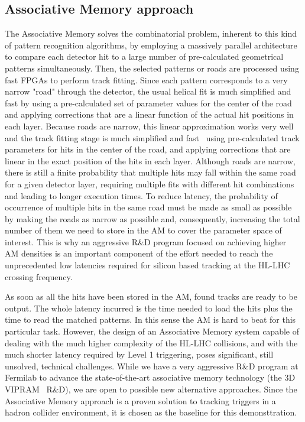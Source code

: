 \subsection{Associative Memory approach}

The Associative Memory solves the combinatorial problem, inherent to this kind of pattern recognition algorithms, by employing a massively parallel architecture to compare each detector hit to a large number of pre-calculated geometrical patterns simultaneously. Then, the selected patterns or roads are processed using fast FPGAs to perform track fitting. Since each pattern corresponds to a very narrow "road" through the detector, the usual helical fit is much simplified and fast by using a pre-calculated set of parameter values for the center of the road and applying corrections that are a linear function of the actual hit positions in each layer.  Because roads are narrow, this linear approximation works very well and the track fitting stage is much simplified and fast~\cite{bib:Ann-09} using pre-calculated track parameters for hits in the center of the road, and applying corrections that are linear in the exact position of the hits in each layer. Although roads are narrow, there is still a finite probability that multiple hits may fall within the same road for a given detector layer, requiring multiple fits with different hit combinations and leading to longer execution times. To reduce latency, the probability of occurrence of multiple hits in the same road must be made as small as possible by making the roads as narrow as possible and, consequently, increasing the total number of them we need to store in the AM to cover the parameter space of interest. This is why an aggressive R\&D program focused on achieving higher AM densities is an important component of the effort needed to reach the unprecedented low latencies required for silicon based tracking at the HL-LHC crossing frequency.

As soon as all the hits have been stored in the AM, found tracks are ready to be output. The whole latency incurred is the time needed to load the hits plus the time to read the matched patterns. In this sense the AM is hard to beat for this particular task. However, the design of an Associative Memory system capable of dealing with the much higher complexity of the HL-LHC collisions, and with the much shorter latency required by Level 1 triggering, poses significant, still unsolved, technical challenges. While we have a very aggressive R\&D program at Fermilab to advance the state-of-the-art associative memory technology (the 3D VIPRAM~\cite{bib:VIP-11} R\&D), we are open to possible new alternative approaches. Since the Associative Memory approach is a proven solution to tracking triggers in a hadron collider environment, it is chosen as the baseline for this demonsttration. 



